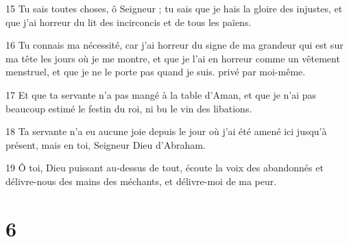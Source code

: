 \par 15 Tu sais toutes choses, ô Seigneur ; tu sais que je hais la gloire des injustes, et que j'ai horreur du lit des incirconcis et de tous les païens.
\par 16 Tu connais ma nécessité, car j'ai horreur du signe de ma grandeur qui est sur ma tête les jours où je me montre, et que je l'ai en horreur comme un vêtement menstruel, et que je ne le porte pas quand je suis. privé par moi-même.
\par 17 Et que ta servante n'a pas mangé à la table d'Aman, et que je n'ai pas beaucoup estimé le festin du roi, ni bu le vin des libations.
\par 18 Ta servante n'a eu aucune joie depuis le jour où j'ai été amené ici jusqu'à présent, mais en toi, Seigneur Dieu d'Abraham.
\par 19 Ô toi, Dieu puissant au-dessus de tout, écoute la voix des abandonnés et délivre-nous des mains des méchants, et délivre-moi de ma peur.

\chapter{6}

